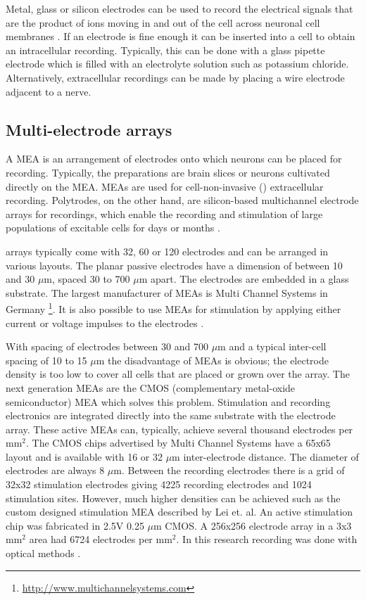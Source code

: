 Metal, glass or silicon electrodes can be used to record the electrical signals that are the product of ions moving in and out of the cell across neuronal cell membranes \cite{Scanziani2009}. If an electrode is fine enough it can be inserted into a cell to obtain an intracellular recording. Typically, this can be done with a glass pipette electrode which is filled with an electrolyte solution such as potassium chloride. Alternatively, extracellular recordings can be made by placing a wire electrode adjacent to a nerve. 

\subsection{Multi-electrode arrays}
A \ac{MEA} is an arrangement of electrodes onto which neurons can be placed for recording. Typically, the preparations  are brain slices or neurons cultivated directly on the \ac{MEA}. \Acp{MEA} are used for cell-non-invasive () extracellular recording. Polytrodes, on the other hand, are silicon-based multichannel electrode arrays for  recordings, which enable the recording and stimulation of large populations of excitable cells for days or months \cite{Spira2013, Blanche2005}. 

 arrays typically come with 32, 60 or 120 electrodes and can be arranged in various layouts. The planar passive electrodes have a dimension of between 10 and 30 $\mu$m, spaced 30 to 700 $\mu$m apart. The electrodes are embedded in a glass substrate. The largest manufacturer of \acp{MEA} is Multi Channel Systems in Germany \footnote{\url{http://www.multichannelsystems.com}}. It is also possible to use \acp{MEA} for stimulation by applying either current or voltage impulses to the electrodes \cite{Fejtl2006}.

With spacing of electrodes between 30 and 700 $\mu$m and a typical inter-cell spacing of 10 to 15 $\mu$m the disadvantage of \acp{MEA} is obvious; the electrode density is too low to cover all cells that are placed or grown over the array. The next generation \acp{MEA} are the CMOS (complementary metal-oxide semiconductor) \ac{MEA} which solves this problem. Stimulation and recording electronics are integrated directly into the same substrate with the electrode array. These active \acp{MEA} can, typically, achieve several thousand electrodes per mm$^{2}$. The CMOS chips advertised by Multi Channel Systems have a 65x65 layout and is available with 16 or 32 $\mu$m inter-electrode distance. The diameter of electrodes are always 8 $\mu$m. Between the recording electrodes there is a grid of 32x32 stimulation electrodes giving 4225 recording electrodes and 1024 stimulation sites. However, much higher densities can be achieved such as the custom designed stimulation \ac{MEA} described by Lei et. al. An active stimulation chip was fabricated in 2.5V 0.25 $\mu$m CMOS. A 256x256 electrode array in a 3x3 mm$^{2}$ area had 6724 electrodes per mm$^{2}$. In this research recording was done with optical methods \cite{Lei2008, Lei2011}.


